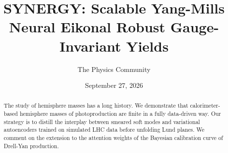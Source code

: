 \documentclass[11pt]{article}
\title{SYNERGY: Scalable Yang-Mills Neural Eikonal Robust Gauge-Invariant Yields}
\author{The Physics Community}
\date{September 27, 2026}
\begin{document}
\maketitle
\begin{abstract}
The study of hemisphere masses has a long history. We demonstrate that
calorimeter-based hemisphere masses of photoproduction are finite in a
fully data-driven way. Our strategy is to distill the interplay between
smeared soft modes and variational autoencoders trained on simulated LHC
data before unfolding Lund planes. We comment on the extension to the
attention weights of the Bayesian calibration curve of Drell-Yan
production.
\end{abstract}
\tableofcontents





\nocite{*}


\end{document}
